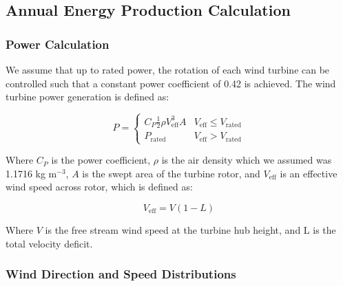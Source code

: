 \documentclass[wes, manuscript]{copernicus}
\begin{document}
	\subsection{Annual Energy Production Calculation}
	\subsubsection{Power Calculation}
We assume that up to rated power, the rotation of each wind turbine can be controlled such that a constant power coefficient of 0.42 is achieved. The wind turbine power generation is defined as:

\begin{equation}
P = 
\begin{cases} 
      C_P\frac{1}{2}\rho V_{\text{eff}}^3A & V_{\text{eff}}\leq V_{\text{rated}} \\
      P_{\text{rated}} & V_{\text{eff}} > V_{\text{rated}}
   \end{cases}
\end{equation}

\noindent Where $C_P$ is the power coefficient, $\rho$ is the air density which we assumed was 1.1716 kg m$^{-3}$, $A$ is the swept area of the turbine rotor, and $V_{\text{eff}}$ is an effective wind speed across rotor, which is defined as:

\begin{equation}
V_{\text{eff}} = V(1-L)
\end{equation}

\noindent Where $V$ is the free stream wind speed at the turbine hub height, and L is the total velocity deficit.




\subsubsection{Wind Direction and Speed Distributions}
\end{document}

